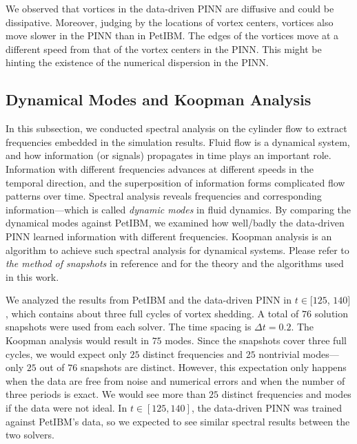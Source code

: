 We observed that vortices in the data-driven PINN are diffusive and could be dissipative.
Moreover, judging by the locations of vortex centers, vortices also move slower in the PINN than in PetIBM.
The edges of the vortices move at a different speed from that of the vortex centers in the PINN.
This might be hinting the existence of the numerical dispersion in the PINN.

\subsection{Dynamical Modes and Koopman Analysis}\label{sec:cylinder-re200-koopman}

In this subsection, we conducted spectral analysis on the cylinder flow to extract frequencies embedded in the simulation results.
Fluid flow is a dynamical system, and how information (or signals) propagates in time plays an important role.
Information with different frequencies advances at different speeds in the temporal direction, and the superposition of information forms complicated flow patterns over time.
Spectral analysis reveals frequencies and corresponding information---which is called {\it dynamic modes} in fluid dynamics.
By comparing the dynamical modes against PetIBM, we examined how well/badly the data-driven PINN learned information with different frequencies.
Koopman analysis is an algorithm to achieve such spectral analysis for dynamical systems.
Please refer to {\it the method of snapshots} in reference \cite{chen_variants_2012} and \cite{rowley_spectral_2009} for the theory and the algorithms used in this work.

We analyzed the results from PetIBM and the data-driven PINN in $t\in$$[125$, $140]$, which contains about three full cycles of vortex shedding.
A total of $76$ solution snapshots were used from each solver.
The time spacing is $\Delta t = 0.2$.
The Koopman analysis would result in $75$ modes.
Since the snapshots cover three full cycles, we would expect only $25$ distinct frequencies and $25$ nontrivial modes---only $25$ out of $76$ snapshots are distinct.
However, this expectation only happens when the data are free from noise and numerical errors and when the number of three periods is exact.
We would see more than $25$ distinct frequencies and modes if the data were not ideal.
In $t \in [125, 140]$, the data-driven PINN was trained against PetIBM's data, so we expected to see similar spectral results between the two solvers.

